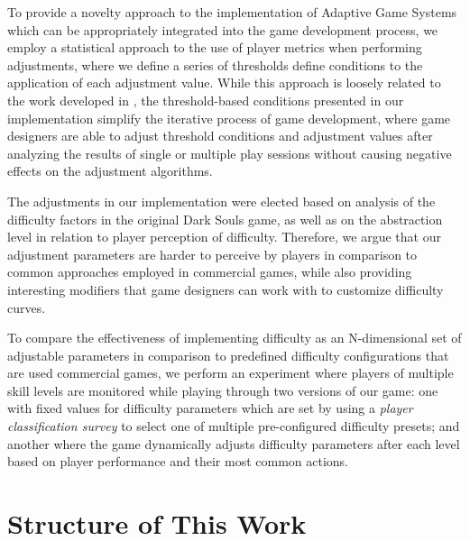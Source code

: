 To provide a novelty approach to the implementation of Adaptive Game Systems which can be appropriately integrated into the game development process, we employ a statistical approach to the use of player metrics when performing adjustments, where we define a series of thresholds define conditions to the application of each adjustment value. While this approach is loosely related to the work developed in \cite{article_casefordda}, the threshold-based conditions presented in our implementation simplify the iterative process of game development, where game designers are able to adjust threshold conditions and adjustment values after analyzing the results of single or multiple play sessions without causing negative effects on the adjustment algorithms.

The adjustments in our implementation were elected based on analysis of the difficulty factors in the original Dark Souls game, as well as on the abstraction level in relation to player perception of difficulty. Therefore, we argue that our adjustment parameters are harder to perceive by players in comparison to common approaches employed in commercial games, while also providing interesting modifiers that game designers can work with to customize difficulty curves.

To compare the effectiveness of implementing difficulty as an N-dimensional set of adjustable parameters in comparison to predefined difficulty configurations that are used commercial games, we perform an experiment where players of multiple skill levels are monitored while playing through two versions of our game: one with fixed values for difficulty parameters which are set by using a \emph{player classification survey} to select one of multiple pre-configured difficulty presets; and another where the game dynamically adjusts difficulty parameters after each level based on player performance and their most common actions.


\section{Structure of This Work}

